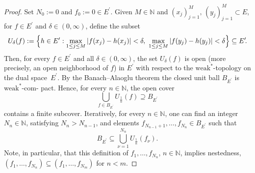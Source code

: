 \documentclass[reqno]{amsart}
\numberwithin{equation}{section}
\newcommand{\bbN}{\mathbb{N}}
\newcommand{\dual}[1]{{#1}^{\prime}}
\theoremstyle{remark}
\theoremstyle{definition}
\begin{document}
\begin{proof} 	
	Set $N_0:=0$ 
	and $f_0 := 0 \in\dual{E}$\!.  
	Given $M\in\bbN$ and 
	$(x_j)_{j=1}^M, \, (y_j)_{j=1}^M \subset E$, 
	for $f\in \dual{E}$ and $\delta\in(0,\infty)$,
	define the subset 
	\[
		U_\delta(f) 
		:= 
		\Bigl\{ h \in \dual{E} : 
		\max_{1\leq j\leq M} | f(x_j) - h(x_j) | < \delta, \ 
		\max_{1\leq j\leq M} | f(y_j) - h(y_j) | < \delta  
		\Bigr\} 
		\subseteq  
		\dual{E}\! . 
	\]
	Then, 
	for every $f\in\dual{E}$ and all $\delta\in(0,\infty)$, 
	the set $U_\delta(f) $ is open 
	(more precisely, an open neighborhood of $f$)
	in $\dual{E}$ 
	with respect to the 
	$\text{weak}^*$-topology on the dual space~$\dual{E}$\!. 
	By the Banach--Alaoglu theorem the closed unit ball 
	$B_{\dual{E}}$ is $\text{weak}^*$-com- pact. 
	Hence, for every $n\in\bbN$, the open cover 
	\[
		\bigcup_{f\in B_{\dual{E}}} 
		U_{\frac{1}{n}}( f ) 
		\supseteq  B_{\dual{E}}
	\]
	contains a finite subcover.
	Iteratively, for every $n\in\bbN$, 
	one can find 
	an integer $N_n\in\bbN$,  
	satisfying $N_n > N_{n-1}$, 
	and elements  
	$f_{N_{n-1}+1},\ldots,f_{N_n} \in B_{\dual{E}}$  
	such that 
	\[
		B_{\dual{E}} 
		\subseteq 
		\bigcup_{\nu=1}^{N_n} 
		U_{ \frac{1}{n}}( f_{\nu} ) . 
	\]
	Note, in particular, 
	that this definition of 
	$f_1,\ldots,f_{N_n}$, $n\in\bbN$, 
	implies nestedness, 
	$( f_1,\ldots,f_{N_n} ) \subseteq ( f_1,\ldots,f_{N_m} )$ 
	for $n<m$. 
	

\end{proof}
\end{document}
